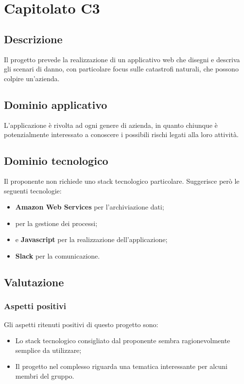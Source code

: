\documentclass[../StudioDiFattibilita.tex]{subfiles}
\begin{document}
	\section{Capitolato C3}
		\subsection{Descrizione}
			Il progetto prevede la realizzazione di un applicativo web che disegni e descriva gli scenari di danno, con particolare focus sulle catastrofi naturali, che possono colpire un'azienda.
		\subsection{Dominio applicativo}
			L'applicazione è rivolta ad ogni genere di azienda, in quanto chiunque è potenzialmente interessato a conoscere i possibili rischi legati alla loro attività.
		\subsection{Dominio tecnologico}
			Il proponente non richiede uno stack tecnologico particolare. Suggerisce però le seguenti tecnologie:
			\begin{itemize}
				\item \textbf{Amazon Web Services} per l'archiviazione dati;
				\item \textbf{} per la gestione dei processi;
				\item \textbf{} e \textbf{Javascript} per la realizzazione dell'applicazione;
				\item \textbf{Slack} per la comunicazione.
			\end{itemize}
		\subsection{Valutazione}
			\subsubsection{Aspetti positivi}
				Gli aspetti ritenuti positivi di questo progetto sono:
				\begin{itemize}
					\item Lo stack tecnologico consigliato dal proponente sembra ragionevolmente semplice da utilizzare;
					\item Il progetto nel complesso riguarda una tematica interessante per alcuni membri del gruppo.
				\end{itemize}					
\end{document}
